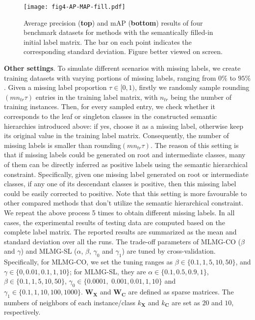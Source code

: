 \documentclass[twocolumn]{svjour3}          %
\newcommand{\C}{\mathbf{C}}
\newcommand{\X}{\mathbf{X}}
\newcommand{\W}{\mathbf{W}}
\begin{document}
\begin{figure*}[!tbh]
\centering
\texttt{[image: fig4-AP-MAP-fill.pdf]}
\caption{Average precision (\textbf{top}) and mAP (\textbf{bottom}) results of four benchmark datasets for methods with the semantically filled-in initial label matrix. The bar on each point indicates the corresponding standard deviation. Figure better viewed on screen.}
\label{fig: AP and MAP results with fillin initial}
\end{figure*}


\vspace{4pt}\noindent\textbf{Other settings}. 
To simulate different scenarios with missing labels, we create training datasets with varying portions of missing labels, ranging from $0\%$ to $95\%$. 
Given a missing label proportion $\tau \in [0, 1)$, firstly we randomly sample rounding$(mn_{tr}\tau)$ entries in the training label matrix, with $n_{tr}$ being the number of training instances.
Then, for every sampled entry, we check whether it corresponds to the leaf or singleton classes in the constructed semantic hierarchies introduced above: if yes, choose it as a missing label, otherwise keep its original value in the training label matrix. 
Consequently, the number of missing labels is smaller than rounding$(mn_{tr}\tau)$. 
The reason of this setting is that if missing labels could be generated on root and intermediate classes, many of them can be directly inferred as positive labels using the semantic hierarchical constraint. Specifically, given one missing label generated on root or intermediate classes, if any one of its descendant classes is positive, then this missing label could be easily corrected to positive. 
Note that this setting is more favourable to other compared methods that don't utilize the semantic hierarchical constraint. 
%
We repeat the above process 5 times to obtain different missing labels. In all cases, the experimental results of testing data are computed based on the complete label matrix. The reported results are summarized as the mean and standard deviation over all the runs.
The trade-off parameters of MLMG-CO ($\beta$ and $\gamma$) and MLMG-SL ($\alpha$, $\beta$, $\gamma_0$ and $\gamma_1$) are tuned by cross-validation. 
Specifically, for MLMG-CO, we set the tuning ranges as $\beta \in \{0.1, 1, 5, 10, 50\}$, and $\gamma \in \{0, 0.01, 0.1, 1, 10\}$; for MLMG-SL, they are $\alpha \in \{0.1, 0.5, 0.9, 1\}$, $\beta \in \{0.1, 1, 5, 10, 50\}$, $\gamma_0 \in \{0.0001,$ $0.001, 0.01, 1, 10\}$ and $\gamma_1 \in \{0.1, 1, 10, 100, 1000\}$.
$\W_\X$ and $\W_\C$ are defined as sparse matrices. The numbers of neighbors of each instance/class $k_\X$ and $k_\C$ are set as $20$ and $10$, respectively.
\end{document}
